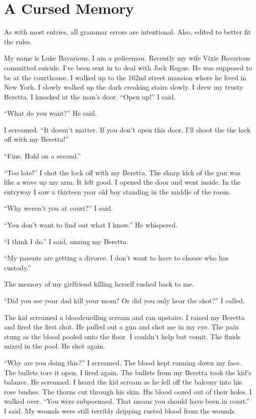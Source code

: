 \chapter{A Cursed Memory}


As with most entries, all grammar errors are intentional. Also,
edited to better fit the rules.


My name is Luke Bavarious. I am a policeman. Recently my wife Vixie
Bavarious committed suicide. I've been sent in to deal with
Jack Rogue. He was supposed to be at the courthouse. I walked up to
the 162nd street mansion where he lived in New York. I slowly
walked up the dark creaking stairs slowly. I drew my trusty
Beretta. I knocked at the man's door. ``Open up!''
I said.

``What do you want?'' He said.

I screamed. ``It doesn't matter. If you don't open
this door, I'll shoot the the lock off with my
Beretta!''

``Fine. Hold on a second.''

``Too late!'' I shot the lock off with my Beretta. The
sharp kick of the gun was like a wave up my arm. It felt good. I
opened the door and went inside. In the entryway I saw a thirteen
year old boy standing in the middle of the room.

``Why weren't you at court?'' I said.

``You don't want to find out what I know.'' He
whispered.

``I think I do.'' I said, aiming my Beretta.

``My parents are getting a divorce. I don't want to have
to choose who has custody.''

The memory of my girlfriend killing herself rushed back to
me.

``Did you see your dad kill your mom? Or did you only hear the
shot?'' I called.

The kid screamed a bloodcurdling scream and ran upstairs. I raised
my Beretta and fired the first shot. He pulled out a gun and shot
me in my eye. The pain stung as the blood pooled onto the floor. I
couldn't help but vomit. The fluids mixed in the pool. He
shot again.

``Why are you doing this?'' I screamed. The blood kept
running down my face. The bullets tore it open. I fired again. The
bullets from my Beretta took the kid's balance. He screamed.
I heard the kid scream as he fell off the balcony into his rose
bushes. The thorns cut through his skin. His blood oozed out of
their holes. I walked over. ``You were subpoenaed. That means
you should have been in court.'' I said. My wounds were still
terribly dripping rusted blood from the wounds.

